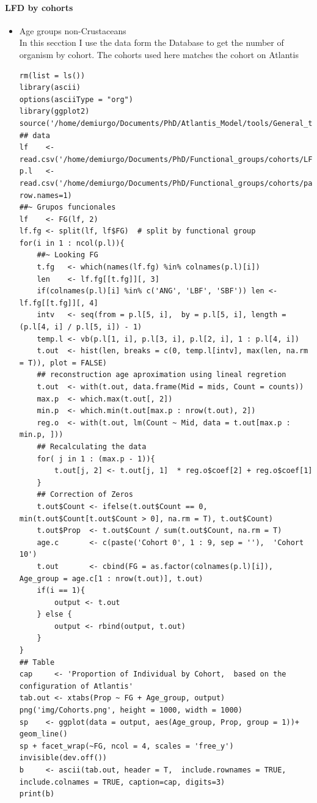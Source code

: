 \documentclass[11pt]{article}
\begin{document}
\paragraph*{LFD by cohorts}
\label{sec-5-2-1-11}
\begin{itemize}

\item Age groups non-Crustaceans\\
\label{sec-5-2-1-11-1}%
In this secction I use the data form the Database to get the number of organism by cohort. The cohorts used here matches the cohort on Atlantis

\begin{verbatim}
rm(list = ls())
library(ascii)
options(asciiType = "org")
library(ggplot2)
source('/home/demiurgo/Documents/PhD/Atlantis_Model/tools/General_tools/Atlantis_tools.R')
## data
lf    <- read.csv('/home/demiurgo/Documents/PhD/Functional_groups/cohorts/LF.csv')
p.l   <- read.csv('/home/demiurgo/Documents/PhD/Functional_groups/cohorts/params.csv', row.names=1)
##~ Grupos funcionales
lf    <- FG(lf, 2)
lf.fg <- split(lf, lf$FG)  # split by functional group
for(i in 1 : ncol(p.l)){
    ##~ Looking FG
    t.fg   <- which(names(lf.fg) %in% colnames(p.l)[i])
    len    <- lf.fg[[t.fg]][, 3]
    if(colnames(p.l)[i] %in% c('ANG', 'LBF', 'SBF')) len <- lf.fg[[t.fg]][, 4]
    intv   <- seq(from = p.l[5, i],  by = p.l[5, i], length = (p.l[4, i] / p.l[5, i]) - 1)
    temp.l <- vb(p.l[1, i], p.l[3, i], p.l[2, i], 1 : p.l[4, i])
    t.out  <- hist(len, breaks = c(0, temp.l[intv], max(len, na.rm = T)), plot = FALSE)
    ## reconstruction age aproximation using lineal regretion
    t.out  <- with(t.out, data.frame(Mid = mids, Count = counts))
    max.p  <- which.max(t.out[, 2])
    min.p  <- which.min(t.out[max.p : nrow(t.out), 2])
    reg.o  <- with(t.out, lm(Count ~ Mid, data = t.out[max.p : min.p, ]))
    ## Recalculating the data
    for( j in 1 : (max.p - 1)){
        t.out[j, 2] <- t.out[j, 1]  * reg.o$coef[2] + reg.o$coef[1]
    }
    ## Correction of Zeros
    t.out$Count <- ifelse(t.out$Count == 0, min(t.out$Count[t.out$Count > 0], na.rm = T), t.out$Count)
    t.out$Prop  <- t.out$Count / sum(t.out$Count, na.rm = T)
    age.c       <- c(paste('Cohort 0', 1 : 9, sep = ''),  'Cohort 10')
    t.out       <- cbind(FG = as.factor(colnames(p.l)[i]), Age_group = age.c[1 : nrow(t.out)], t.out)
    if(i == 1){
        output <- t.out
    } else {
        output <- rbind(output, t.out)
    }
}
## Table
cap     <- 'Proportion of Individual by Cohort,  based on the configuration of Atlantis'
tab.out <- xtabs(Prop ~ FG + Age_group, output)
png('img/Cohorts.png', height = 1000, width = 1000)
sp    <- ggplot(data = output, aes(Age_group, Prop, group = 1))+ geom_line()
sp + facet_wrap(~FG, ncol = 4, scales = 'free_y')
invisible(dev.off())
b     <- ascii(tab.out, header = T,  include.rownames = TRUE, include.colnames = TRUE, caption=cap, digits=3)
print(b)
\end{verbatim}


\end{itemize}
\end{document}
